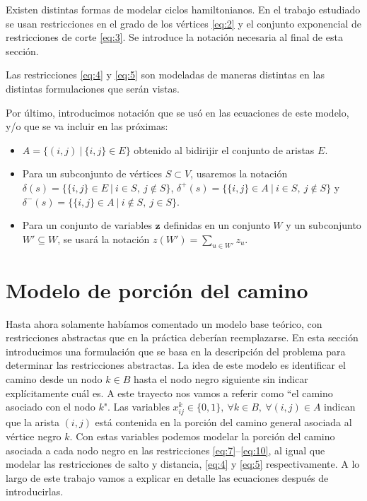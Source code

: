 \documentclass[10pt, a4paper]{article}
\theoremstyle{definition}
\begin{document}
Existen distintas formas de modelar ciclos hamiltonianos. En el trabajo estudiado se usan restricciones en el grado de los vértices \ref{eq:2} y el conjunto exponencial de restricciones de corte \ref{eq:3}. Se introduce la notación necesaria al final de esta sección.

Las restricciones \ref{eq:4} y \ref{eq:5} son modeladas de maneras distintas en las distintas formulaciones que serán vistas.

Por último, introducimos notación que se usó en las ecuaciones de este modelo, y/o que se va incluir en las próximas:

\begin{itemize}
	\item $A = \{(i,j)\ |\ \{i,j\} \in E\}$ obtenido al bidirijir el conjunto de aristas $E$.
	\item Para un subconjunto de vértices $S \subset V$, usaremos la notación $\delta(s) = \{\{i,j\} \in E\ |\ i \in S,\ j \notin S\}$,
$\delta^+(s) = \{\{i,j\} \in A\ |\ i \in S,\ j \notin S\}$ y $\delta^-(s) = \{\{i,j\} \in A\ |\ i \notin S,\ j \in S\}$.
	\item Para un conjunto de variables $\textbf{z}$ definidas en un conjunto $W$ y un subconjunto $W' \subseteq W$, se usará la notación $z(W') = \sum_{u \in W'} z_u$.
\end{itemize}

\section{Modelo de porción del camino}

Hasta ahora solamente habíamos comentado un modelo base teórico, con restricciones abstractas que en la práctica deberían reemplazarse. En esta sección introducimos una formulación que se basa en la descripción del problema para determinar las restricciones abstractas. La idea de este modelo es identificar el camino desde un nodo $k \in B$ hasta el nodo negro siguiente sin indicar explícitamente cuál es. A este trayecto nos vamos a referir como “el camino asociado con el nodo $k$". Las variables $x_{i j}^{k} \in\{0,1\},\ \forall k \in B,\ \forall(i, j) \in A$ indican que la arista $(i,j)$ está contenida en la porción del camino general asociada al vértice negro $k$. Con estas variables podemos modelar la porción del camino asociada a cada nodo negro en las restricciones \ref{eq:7}–\ref{eq:10}, al igual que modelar las restricciones de salto y distancia, \ref{eq:4} y \ref{eq:5} respectivamente. A lo largo de este trabajo vamos a explicar en detalle las ecuaciones después de introducirlas.
\end{document}
